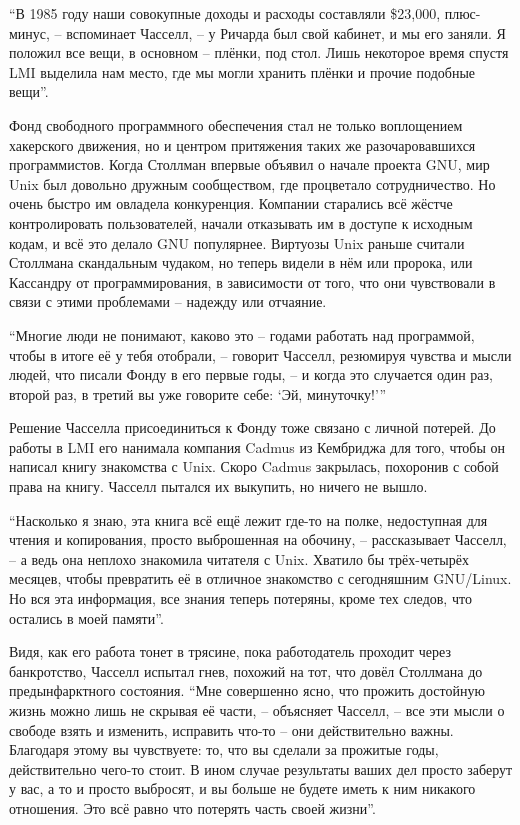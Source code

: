 \enquote{В 1985 году наши совокупные доходы и расходы составляли \$23,000, плюс-минус, -- вспоминает Часселл, -- у Ричарда был свой кабинет, и мы его заняли. Я положил все вещи, в основном -- плёнки, под стол. Лишь некоторое время спустя LMI выделила нам место, где мы могли хранить плёнки и прочие подобные вещи}.

Фонд свободного программного обеспечения стал не только воплощением хакерского движения, но и центром притяжения таких же разочаровавшихся программистов. Когда Столлман впервые объявил о начале проекта GNU, мир Unix был довольно дружным сообществом, где процветало сотрудничество. Но очень быстро им овладела конкуренция. Компании старались всё жёстче контролировать пользователей, начали отказывать им в доступе к исходным кодам, и всё это делало GNU популярнее. Виртуозы Unix раньше считали Столлмана скандальным чудаком, но теперь видели в нём или пророка, или Кассандру от программирования, в зависимости от того, что они чувствовали в связи с этими проблемами -- надежду или отчаяние.

\enquote{Многие люди не понимают, каково это -- годами работать над программой, чтобы в итоге её у тебя отобрали, -- говорит Часселл, резюмируя чувства и мысли людей, что писали Фонду в его первые годы, -- и когда это случается один раз, второй раз, в третий вы уже говорите себе: \enquote{Эй, минуточку!}\hspace{0.01in}}

Решение Часселла присоединиться к Фонду тоже связано с личной потерей. До работы в LMI его нанимала компания Cadmus из Кембриджа для того, чтобы он написал книгу знакомства с Unix. Скоро Cadmus закрылась, похоронив с собой права на книгу. Часселл пытался их выкупить, но ничего не вышло.

\enquote{Насколько я знаю, эта книга всё ещё лежит где-то на полке, недоступная для чтения и копирования, просто выброшенная на обочину, -- рассказывает Часселл, -- а ведь она неплохо знакомила читателя с Unix. Хватило бы трёх-четырёх месяцев, чтобы превратить её в отличное знакомство с сегодняшним GNU/Linux. Но вся эта информация, все знания теперь потеряны, кроме тех следов, что остались в моей памяти}.

Видя, как его работа тонет в трясине, пока работодатель проходит через банкротство, Часселл испытал гнев, похожий на тот, что довёл Столлмана до предынфарктного состояния. \enquote{Мне совершенно ясно, что прожить достойную жизнь можно лишь не скрывая её части, -- объясняет Часселл, -- все эти мысли о свободе взять и изменить, исправить что-то -- они действительно важны. Благодаря этому вы чувствуете: то, что вы сделали за прожитые годы, действительно чего-то стоит. В ином случае результаты ваших дел просто заберут у вас, а то и просто выбросят, и вы больше не будете иметь к ним никакого отношения. Это всё равно что потерять часть своей жизни}.

\bigskip

\theendnotes
\setcounter{endnote}{0}
